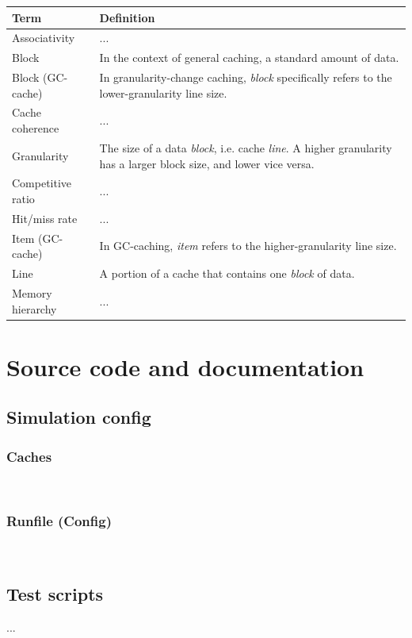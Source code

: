 \documentclass[12pt,twoside]{reedthesis}
\begin{document}
\def\arraystretch{1.5}
\begin{tabular}{p{1.5in}p{3.8in}}
    \hline
    \textbf{Term}       & \textbf{Definition} \\
    \hline
	Associativity		& ... \\
	Block               & In the context of general caching, a standard amount of data. \\
	Block (GC-cache)	& In granularity-change caching, \textit{block} specifically refers to the lower-granularity line size. \\
	Cache coherence		& ... \\
	Granularity         & The size of a data \textit{block}, i.e. cache \textit{line}. A higher granularity has a larger block size, and lower vice versa. \\
	Competitive ratio	& ... \\
	Hit/miss rate 		& ... \\
    Item (GC-cache)  	& In GC-caching, \textit{item} refers to the higher-granularity line size. \\
    Line                & A portion of a cache that contains one \textit{block} of data. \\
	Memory hierarchy	& ... \\
\end{tabular}

\chapter{Source code and documentation}

\section{Simulation config}

\subsection*{Caches}
%
\;\\

\subsection*{Runfile (Config)}
%
\;\\

\section{Test scripts}

...

\backmatter %

\nocite{*}
\printbibliography[title=References]
\end{document}
